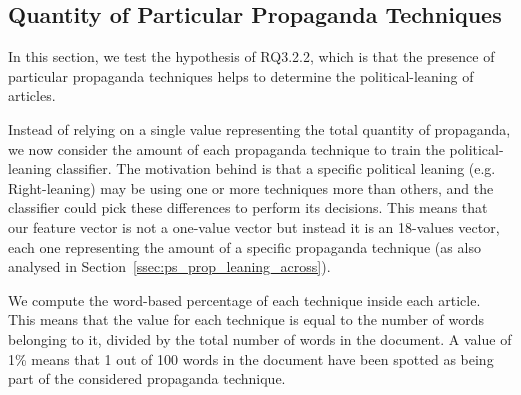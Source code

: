 



\subsection{Quantity of Particular Propaganda Techniques}
\label{ssec:ps_prop_leaning_classifier_techniques}

In this section, we test the hypothesis of RQ3.2.2, which is that the presence of particular propaganda techniques helps to determine the political-leaning of articles. 

Instead of relying on a single value representing the total quantity of propaganda, we now consider the amount of each propaganda technique to train the political-leaning classifier.
The motivation behind is that a specific political leaning (e.g. Right-leaning) may be using one or more techniques more than others, and the classifier could pick these differences to perform its decisions.
This means that our feature vector is not a one-value vector but instead it is an 18-values vector, each one representing the amount of a specific propaganda technique (as also analysed in Section~\ref{ssec:ps_prop_leaning_across}).


We compute the word-based percentage of each technique inside each article. This means that the value for each technique is equal to the number of words belonging to it, divided by the total number of words in the document. A value of 1\% means that 1 out of 100 words in the document have been spotted as being part of the considered propaganda technique.

